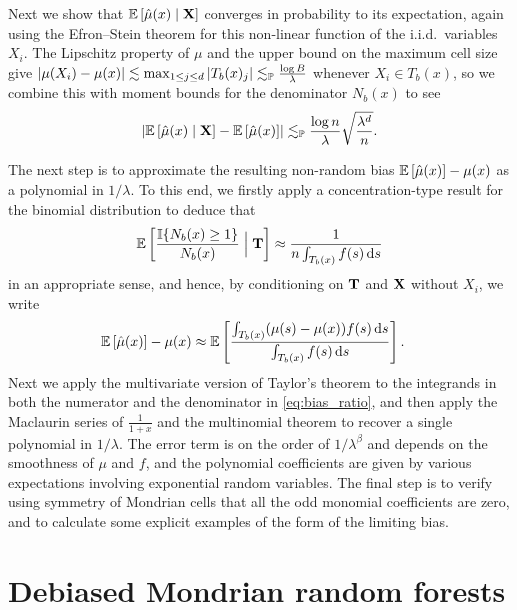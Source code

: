 Next we show that $\E \left[ \hat \mu(x) \mid \bX \right]$ converges in
probability to its expectation, again using the Efron--Stein theorem for this
non-linear function of the i.i.d.\ variables $X_i$. The Lipschitz property of
$\mu$ and the upper bound on the maximum cell size give
$|\mu(X_i) - \mu(x)| \lesssim \max_{1 \leq j \leq d} |T_b(x)_j|
\lesssim_\P \frac{\log B}{\lambda}$
whenever $X_i \in T_b(x)$,
so we combine this with moment bounds for the denominator $N_b(x)$ to see
%
\begin{align*}
  \left|
  \E \left[ \hat \mu(x) \mid \bX \right]
  - \E \left[ \hat \mu(x) \right]
  \right|
  \lesssim_\P
  \frac{\log n}{\lambda} \sqrt{\frac{\lambda^d}{n}}.
\end{align*}

The next step is to approximate the resulting non-random bias
$\E \left[ \hat \mu(x) \right] - \mu(x)$ as a polynomial in $1/\lambda$.
To this end, we firstly apply a concentration-type result for the binomial
distribution to deduce that
%
\begin{align*}
  \E \left[ \frac{\I\{N_b(x) \geq 1\}}{N_b(x)} \Bigm| \bT \right]
  \approx \frac{1}{n \int_{T_b(x)} f(s) \diff s}
\end{align*}
%
in an appropriate sense, and hence,
by conditioning on $\bT$ and $\bX$ without $X_i$, we write
%
\begin{align}
  \label{eq:bias_ratio}
  \E \left[ \hat \mu(x) \right] - \mu(x)
  &\approx
  \E \left[
    \frac{\int_{T_b(x)} (\mu(s) - \mu(x)) f(s) \diff s}
    {\int_{T_b(x)} f(s) \diff s}
  \right].
\end{align}
%
Next we apply the multivariate version of Taylor's theorem to the integrands in
both the numerator and the denominator in \eqref{eq:bias_ratio}, and then apply
the Maclaurin series of $\frac{1}{1+x}$ and the multinomial theorem to recover
a single polynomial in $1/\lambda$. The error term is on the order of
$1/\lambda^\beta$ and depends on the smoothness of $\mu$ and $f$, and the
polynomial coefficients are given by various expectations involving exponential
random variables. The final step is to verify using symmetry of Mondrian cells
that all the odd monomial coefficients are zero, and to calculate some explicit
examples of the form of the limiting bias.

\section{Debiased Mondrian random forests}%
\label{sec:debiased}

